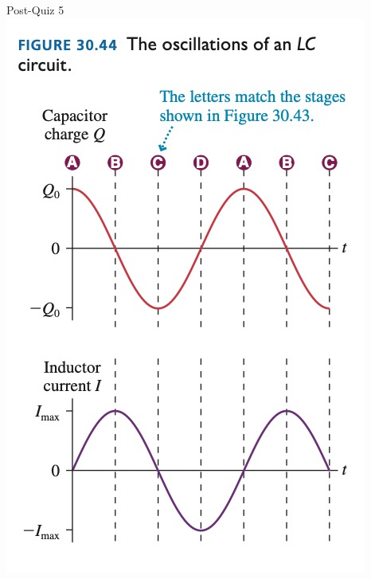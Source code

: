 \documentclass{article}
\begin{document}
\begin{section}{Post-Quiz 5}
 \includegraphics[width=\linewidth]{final_cheet_sheet_resources/knhwzgniatxeirlvrdqvgqrgyvbpycxs.jpg}
\end{section}
\end{document}
